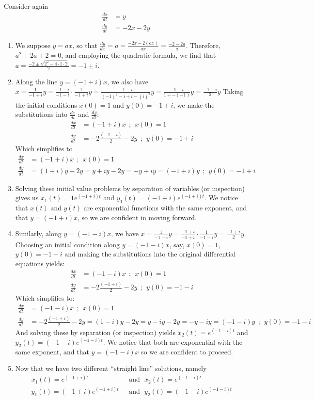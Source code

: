 Consider again 
\begin{align*}
\frac{dx}{dt}&=y \\ \frac{dy}{dt}&= -2x-2y
\end{align*}
\begin{enumerate}
\item We suppose $y=ax$, so that $\frac{dy}{dx} = a = \frac{-2x-2(ax)}{ax} = \frac{-2-2a}{a}$.  
Therefore, $a^2 + 2a + 2 = 0$, and employing the quadratic formula, we find that $a = \frac{-2 \pm \sqrt{2^2 - 4\cdot1\cdot2}}{2} = -1 \pm i$.
\item Along the line $y=(-1+i)x$, we also have $x=\frac{1}{-1+i} y = \frac{-1-i}{-1-i}\cdot\frac{1}{-1+i}  y = \frac{-1-i}{(-1)^2 -i +i -(i)^2} y = \frac{-1-i}{1 + -(-1)} y = \frac{-1-i}{2} y$
Taking the initial conditions $x(0) = 1$ and $y(0) = -1+i$, we make the substitutions into $\frac{dx}{dt}$ and $\frac{dy}{dt}$:
\begin{align*}
\frac{dx}{dt}&=(-1+i)x ~~;~~ x(0) = 1 \\ \frac{dy}{dt}&= -2\frac{(-1-i)}{2}-2y ~~;~~ y(0) = -1+i
\end{align*}
Which simplifies to
\begin{align*}
\frac{dx}{dt}&=(-1+i)x~~ ;~~ x(0) = 1 \\ \frac{dy}{dt}&= (1+i)y -2y = y + iy - 2y = -y + iy = (-1+i)y~~ ;~~ y(0) = -1+i
\end{align*}
\item Solving these initial value problems by separation of variables (or inspection) gives us $x_1(t) = 1 e^{(-1+i)t}$ and $y_1(t) = (-1+i) e^{(-1+i)t}$.  We notice that $x(t)$ and $y(t)$ are exponential functions with the same exponent, and that $y=(-1+i)x$, so we are confident in moving forward.
\item Similarly, along $y=(-1-i)x$, we have $x= \frac{1}{-1-i} y = \frac{-1+i}{-1+i}\cdot \frac{1}{-1-i} y = \frac{-1+i}{2} y$.  Choosing an initial condition along $y = (-1-i)x$, say, $x(0) = 1$, $y(0) = -1-i$ and making the substitutions into the original differential equations yields:
\begin{align*}
\frac{dx}{dt}&=(-1-i)x ~~;~~ x(0) = 1 \\ \frac{dy}{dt}&= -2\frac{(-1+i)}{2}-2y ~~;~~ y(0) = -1-i
\end{align*}
Which simplifies to: 
\begin{align*}
\frac{dx}{dt}&=(-1-i)x ~~;~~ x(0) = 1 \\ \frac{dy}{dt}&= -2\frac{(-1+i)}{2}-2y = (1 - i)y - 2y = y-iy - 2y = -y-iy = (-1-i)y~~;~~ y(0) = -1-i
\end{align*}
And solving these by separation (or inspection) yields $x_2(t) = e^{(-1-i)t}$ and $y_2(t) = (-1-i)e^{(-1-i)t}$.  We notice that both are exponential with the same exponent, and that $y=(-1-i)x$ so we are confident to proceed.  
\item Now that we have two different ``straight line'' solutions, namely
 \begin{align*}
x_1(t) = e^{(-1+i)t} &\textrm{~~and~~} x_2(t) = e^{(-1-i)t}\\
y_1(t) = (-1+i)e^{(-1+i)t} &\textrm{~~and~~}  y_2(t) = (-1-i)e^{(-1-i)t}
\end{align*}
\end{enumerate}
